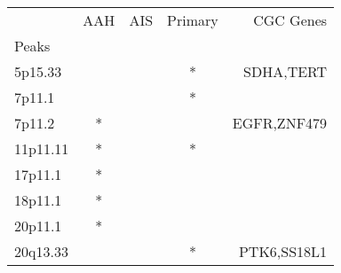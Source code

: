 \begin{tabular}{lcccr}
\toprule
{} & AAH & AIS & Primary &    CGC Genes \\
Peaks    &     &     &         &              \\
\midrule
5p15.33  &     &     &       * &    SDHA,TERT \\
7p11.1   &     &     &       * &              \\
7p11.2   &   * &     &         &  EGFR,ZNF479 \\
11p11.11 &   * &     &       * &              \\
17p11.1  &   * &     &         &              \\
18p11.1  &   * &     &         &              \\
20p11.1  &   * &     &         &              \\
20q13.33 &     &     &       * &  PTK6,SS18L1 \\
\bottomrule
\end{tabular}
